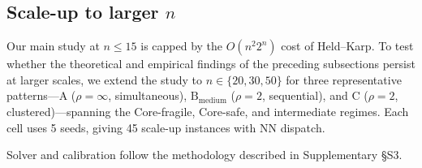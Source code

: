\documentclass[11pt]{article}
\theoremstyle{plain}
\theoremstyle{definition}
\theoremstyle{remark}
\begin{document}
\subsection{Scale-up to larger \texorpdfstring{$n$}{n}}
\label{ssec:scaleup}

Our main study at $n\le 15$ is capped by the $O(n^2 2^n)$ cost of Held--Karp. To test whether the theoretical and empirical findings of the preceding subsections persist at larger scales, we extend the study to $n\in\{20,30,50\}$ for three representative patterns---A ($\rho=\infty$, simultaneous), $\text{B}_{\text{medium}}$ ($\rho=2$, sequential), and C ($\rho=2$, clustered)---spanning the Core-fragile, Core-safe, and intermediate regimes. Each cell uses 5 seeds, giving 45 scale-up instances with NN dispatch.

Solver and calibration follow the methodology described in Supplementary \S S3.
\end{document}
